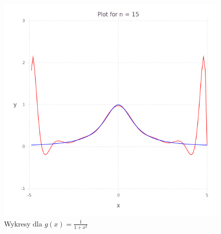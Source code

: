\begin{figure}
\begin{multicols}{2}
    \end{multicols}
    \begin{multicols}{2}
        \includegraphics[width=\linewidth]{../task-6/plots/myplot-1x2-15.png}\par
    \end{multicols}
    \caption{Wykresy dla $g(x) = \frac{1}{1 + x^2}$}    
\end{figure}
